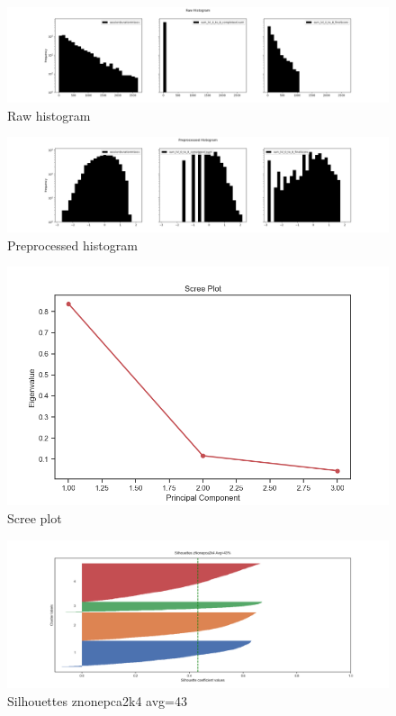 \documentclass{article}
\begin{document}
\begin{figure}[H]
    \centering
    \includegraphics[width=1\columnwidth]{Crystal/progression_logtransform_zNonepca2k4/Raw Histogram.png}
    \caption{Raw histogram}
    \label{fig:Crystalprogressionrawhistogram}
\end{figure}
\begin{figure}[H]
    \centering
    \includegraphics[width=1\columnwidth]{Crystal/progression_logtransform_zNonepca2k4/Preprocessed Histogram.png}
    \caption{Preprocessed histogram}
    \label{fig:Crystalprogressionpreprocessedhistogram}
\end{figure}
\begin{figure}[H]
    \centering
    \includegraphics[width=1\columnwidth]{Crystal/progression_logtransform_zNonepca2k4/Scree Plot.png}
    \caption{Scree plot}
    \label{fig:Crystalprogressionscreeplot}
\end{figure}
\begin{figure}[H]
    \centering
    \includegraphics[width=1\columnwidth]{Crystal/progression_logtransform_zNonepca2k4/Silhouettes zNonepca2k4 Avg=43.png}
    \caption{Silhouettes znonepca2k4 avg=43}
    \label{fig:Crystalprogressionsilhouettesznonepca2k4avg=43}
\end{figure}
\end{document}
